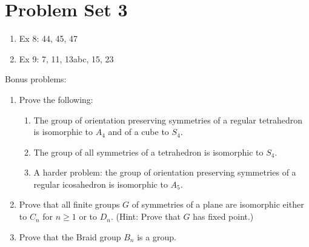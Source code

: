 \pagebreak
\section*{Problem Set 3}
\hypertarget{ModernAlgebra-Assignment03}{}

\begin{enumerate}
    \item{Ex 8: 44, 45, 47}
    \item{Ex 9: 7, 11, 13abc, 15, 23}
\end{enumerate}

Bonus problems:
\begin{enumerate}
    \item{
        Prove the following:
        \begin{enumerate}
            \item{The group of orientation preserving symmetries of a regular tetrahedron is isomorphic to $ A_4 $ and of a cube to $ S_4 $.}
            \item{The group of all symmetries of a tetrahedron is isomorphic to $ S_4 $.}
            \item{A harder problem: the group of orientation preserving symmetries of a regular icosahedron is isomorphic to $ A_5 $.}
        \end{enumerate}
    }
    \item{Prove that all finite groups $ G $ of symmetries of a plane are isomorphic either to $ C_n $ for $ n \ge 1 $ or to $ D_n $. (Hint: Prove that $ G $ has fixed point.)}
    \item{Prove that the Braid group $ B_n $ is a group.}
\end{enumerate}